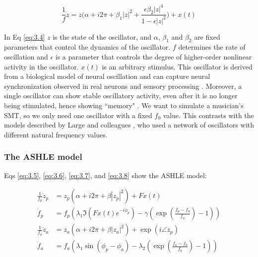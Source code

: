 \documentclass[10pt,letterpaper]{article}
\begin{document}
\begin{equation}
\frac{1}{f}\dot{z} = z\bigg(\alpha + i2\pi + \beta_1|z|^2 + \frac{\epsilon\beta_2|z|^4}{1-\epsilon|z|^2}\bigg) + x(t) \label{eq:3.4}
\end{equation}

In Eq \eqref{eq:3.4} $z$ is the state of the oscillator, and $\alpha$, $\beta_1$ and $\beta_2$ are fixed parameters that control the dynamics of the oscillator. $f$ determines the rate of oscillation and $\epsilon$ is a parameter that controls the degree of higher-order nonlinear activity in the oscillator. $x(t)$ is an arbitrary stimulus. This oscillator is derived from a biological model of neural oscillation and can capture neural synchronization observed in real neurons and sensory processing \cite{lerud2019canonical, tal2017neural}. Moreover, a single oscillator can show stable oscillatory activity, even after it is no longer being stimulated, hence showing ``memory" \cite{kim2015signal}. We want to simulate a musician's SMT, so we only need one oscillator with a fixed $f_0$ value. This contrasts with the models described by Large and colleagues \cite{large2010canonical}, who used a network of oscillators with different natural frequency values.

\subsubsection*{The ASHLE model}

Eqs \eqref{eq:3.5}, \eqref{eq:3.6}, \eqref{eq:3.7}, and \eqref{eq:3.8} show the ASHLE model:

\begin{subequations}
\begin{align}
\frac{1}{f_p}\dot{z}_p &= z_p\left( \alpha + i2\pi + \beta|z_p|^2 \right) + Fx(t) \label{eq:3.5} \\
\dot{f}_p &= f_p \left( \lambda_1 \Im\left( Fx(t)e^{-i\phi_p} \right) - \gamma\left( \exp\left(\frac{f_p-f_a}{f_a}\right)-1 \right) \right) \label{eq:3.6} \\
\frac{1}{f_a}\dot{z}_a &= z_a \left( \alpha + i2\pi + \beta|z_a|^2 \right) + \exp(i \angle z_p) \label{eq:3.7} \\
\dot{f}_a &= f_a \left( \lambda_1 \sin(\phi_p-\phi_a) - \lambda_2 \left( \exp\left(\frac{f_a-f_0}{f_0}\right)-1 \right) \right) \label{eq:3.8}
\end{align}
\end{subequations}
\end{document}
